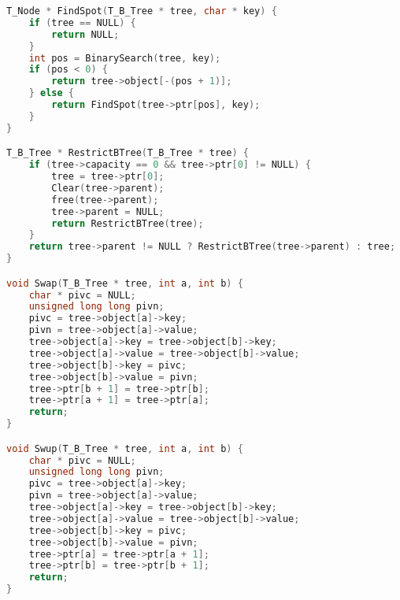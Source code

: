 \begin{lstlisting}[language=C]
T_Node * FindSpot(T_B_Tree * tree, char * key) {
    if (tree == NULL) {
        return NULL;
    }
    int pos = BinarySearch(tree, key);
    if (pos < 0) {
        return tree->object[-(pos + 1)];
    } else {
        return FindSpot(tree->ptr[pos], key);
    }
}

T_B_Tree * RestrictBTree(T_B_Tree * tree) {
    if (tree->capacity == 0 && tree->ptr[0] != NULL) {
        tree = tree->ptr[0];
        Clear(tree->parent);
        free(tree->parent);
        tree->parent = NULL;
        return RestrictBTree(tree);
    }
    return tree->parent != NULL ? RestrictBTree(tree->parent) : tree;
}

void Swap(T_B_Tree * tree, int a, int b) {
    char * pivc = NULL;
    unsigned long long pivn;
    pivc = tree->object[a]->key;
    pivn = tree->object[a]->value;
    tree->object[a]->key = tree->object[b]->key;
    tree->object[a]->value = tree->object[b]->value;
    tree->object[b]->key = pivc;
    tree->object[b]->value = pivn;
    tree->ptr[b + 1] = tree->ptr[b];
    tree->ptr[a + 1] = tree->ptr[a];
    return;
}

void Swup(T_B_Tree * tree, int a, int b) {
    char * pivc = NULL;
    unsigned long long pivn;
    pivc = tree->object[a]->key;
    pivn = tree->object[a]->value;
    tree->object[a]->key = tree->object[b]->key;
    tree->object[a]->value = tree->object[b]->value;
    tree->object[b]->key = pivc;
    tree->object[b]->value = pivn;
    tree->ptr[a] = tree->ptr[a + 1];
    tree->ptr[b] = tree->ptr[b + 1];
    return;
}
\end{lstlisting}

